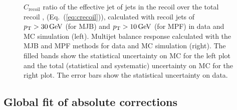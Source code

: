 \documentclass[11pt,twoside,a4paper,cmspaper,final,collab]{cms-tdr}
\begin{document}
\begin{figure}[htbp!]
\caption{\label{fig:multijet}
$C_\mathrm{recoil}$ ratio of the effective jet \pt of jets in the recoil over the total recoil \pt, (Eq.~(\ref{eq:crecoil})), calculated with recoil jets of $p_{\mathrm{T}}>30\,\text{Ge\hspace{-.08em}V}$ (for MJB) and $p_{\mathrm{T}}>10\,\text{Ge\hspace{-.08em}V}$ (for MPF) in data and MC simulation (left). Multijet balance response calculated with the MJB and MPF methods for data and MC simulation (right). The filled bands show the statistical uncertainty on MC for the left plot and the total (statistical and systematic) uncertainty on MC for the right plot. The error bars show the statistical uncertainty on data.
}
\end{figure}

\subsection{Global fit of absolute corrections}
\label{sec:l3res_globalfit}
\end{document}
